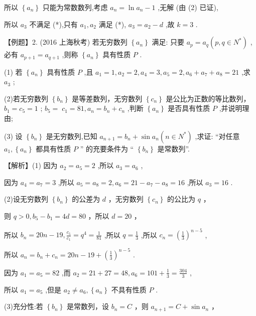 \documentclass[10pt]{article}
\begin{document}
所以 \(\left\{  {a}_{n}\right\}\) 只能为常数数列,考虑 \({a}_{n} = \ln {a}_{n} - 1\) ,无解 (由 (2) 已证),

所以 \({a}_{3}\) 不满足 (*),只有 \({a}_{1},{a}_{2}\) 满足 (*), \({a}_{3} = {a}_{2} - d\) ,故 \(k = 3\) .

【例题】2. (2016 上海秋考) 若无穷数列 \(\left\{  {a}_{n}\right\}\) 满足: 只要 \({a}_{p} = {a}_{q}\left( {p,q \in  {N}^{ * }}\right)\) ,必有 \({a}_{p + 1} = {a}_{q + 1}\) ,则称 \(\left\{  {a}_{n}\right\}\) 具有性质 \(P\) .

(1) 若 \(\left\{  {a}_{n}\right\}\) 具有性质 \(P\) ,且 \({a}_{1} = 1,{a}_{2} = 2,{a}_{4} = 3,{a}_{5} = 2,{a}_{6} + {a}_{7} + {a}_{8} = {21}\) ,求 \({a}_{3}\) ;

(2)若无穷数列 \(\left\{  {b}_{n}\right\}\) 是等差数列，无穷数列 \(\left\{  {c}_{n}\right\}\) 是公比为正数的等比数列， \({b}_{1} = {c}_{5} = 1\) ; \({b}_{5} = \; {c}_{1} = {81},{a}_{n} = {b}_{n} + {c}_{n}\) ,判断 \(\left\{  {a}_{n}\right\}\) 是否具有性质 \(P\) ,并说明理由;

(3) 设 \(\left\{  {b}_{n}\right\}\) 是无穷数列,已知 \({a}_{n + 1} = {b}_{n} + \sin {a}_{n}\left( {n \in  {N}^{ * }}\right)\) ,求证: “对任意 \({a}_{1},\left\{  {a}_{n}\right\}\) 都具有性质 \(P\) ” 的充要条件为 “ \(\left\{  {b}_{n}\right\}\) 是常数列”.

【解析】(1) 因为 \({a}_{2} = {a}_{5} = 2\) ,所以 \({a}_{3} = {a}_{6}\) ,

因为 \({a}_{4} = {a}_{7} = 3\) ,所以 \({a}_{5} = {a}_{8} = 2,{a}_{6} = {21} - {a}_{7} - {a}_{8} = {16}\) ,所以 \({a}_{3} = {16}\) .

(2)设无穷数列 \(\left\{  {b}_{n}\right\}\) 的公差为 \(d\) ，无穷数列 \(\left\{  {c}_{n}\right\}\) 的公比为 \(q\) ，

则 \(q > 0,{b}_{5} - {b}_{1} = {4d} = {80}\) ，所以 \(d = {20}\) ，

所以 \({b}_{n} = {20n} - {19},\frac{{c}_{5}}{{c}_{1}} = {q}^{4} = \frac{1}{81}\) ,所以 \(q = \frac{1}{3}\) ,所以 \({c}_{n} = {\left( \frac{1}{3}\right) }^{n - 5}\) ,

所以 \({a}_{n} = {b}_{n} + {c}_{n} = {20n} - {19} + {\left( \frac{1}{3}\right) }^{n - 5}\) .

因为 \({a}_{1} = {a}_{5} = {82}\) ,而 \({a}_{2} = {21} + {27} = {48},{a}_{6} = {101} + \frac{1}{3} = \frac{304}{3}\) ,

所以 \({a}_{1} = {a}_{5}\) ,但是 \({a}_{2} \neq  {a}_{6},\left\{  {a}_{n}\right\}\) 不具有性质 \(P\) .

(3)充分性:若 \(\left\{  {b}_{n}\right\}\) 是常数列，设 \({b}_{n} = C\) ，则 \({a}_{n + 1} = C + \sin {a}_{n}\) ，
\end{document}
